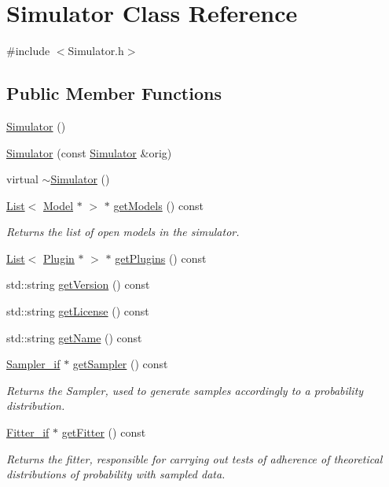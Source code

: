 \hypertarget{class_simulator}{}\section{Simulator Class Reference}
\label{class_simulator}


{\ttfamily \#include $<$Simulator.\+h$>$}

\subsection*{Public Member Functions}
\begin{DoxyCompactItemize}
\item 
\hyperlink{class_simulator_a031573bfcfe2e0f5c9539bcc1c7fc5d9}{Simulator} ()
\item 
\hyperlink{class_simulator_ad0a136ed876c971effe90fa749f18148}{Simulator} (const \hyperlink{class_simulator}{Simulator} \&orig)
\item 
virtual \hyperlink{class_simulator_a0f49aa04f42060a785adf77346b9de9f}{$\sim$\+Simulator} ()
\item 
\hyperlink{class_list}{List}$<$ \hyperlink{class_model}{Model} $\ast$ $>$ $\ast$ \hyperlink{class_simulator_adf2949b99c40c3c94c790786de1a038f}{get\+Models} () const 
\begin{DoxyCompactList}\small\item\em Returns the list of open models in the simulator. \end{DoxyCompactList}\item 
\hyperlink{class_list}{List}$<$ \hyperlink{class_plugin}{Plugin} $\ast$ $>$ $\ast$ \hyperlink{class_simulator_a0e68b96d9af4bb7cf3f0b8a5c2e66d31}{get\+Plugins} () const 
\item 
std\+::string \hyperlink{class_simulator_a2e9d26646db9e0cc35a870514d8dcc3e}{get\+Version} () const 
\item 
std\+::string \hyperlink{class_simulator_ae180aeffe94a7b0af5fb64ce8ad29810}{get\+License} () const 
\item 
std\+::string \hyperlink{class_simulator_a767a6811df08f6327524ab6ccb715672}{get\+Name} () const 
\item 
\hyperlink{class_sampler__if}{Sampler\+\_\+if} $\ast$ \hyperlink{class_simulator_a7477e74d6751ea9e4b841178b0c42f34}{get\+Sampler} () const 
\begin{DoxyCompactList}\small\item\em Returns the Sampler, used to generate samples accordingly to a probability distribution. \end{DoxyCompactList}\item 
\hyperlink{class_fitter__if}{Fitter\+\_\+if} $\ast$ \hyperlink{class_simulator_a7498ab51b3112e487f73eefb6d384b74}{get\+Fitter} () const 
\begin{DoxyCompactList}\small\item\em Returns the fitter, responsible for carrying out tests of adherence of theoretical distributions of probability with sampled data. \end{DoxyCompactList}\end{DoxyCompactItemize}


